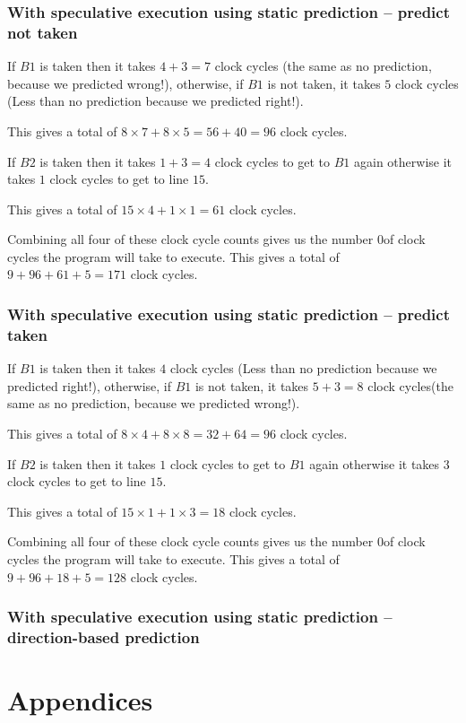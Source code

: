 \documentclass[12pt]{article}
\begin{document}
			\subsubsection{With speculative execution using static prediction – predict not taken}
			
				If $B1$ is taken then it takes $4 + 3 = 7$ clock cycles (the same as no prediction, because we predicted wrong!), otherwise, if $B1$ is not taken, it takes $5$ clock cycles (Less than no prediction because we predicted right!).
				
				This gives a total of $ 8\times7 + 8\times5 = 56 + 40 = 96$ clock cycles.
				
				If $B2$ is taken then it takes $1 + 3 = 4$ clock cycles to get to $B1$ again otherwise it takes $1$ clock cycles to get to line $15$.
			
				This gives a total of $15\times4 + 1\times1 = 61$ clock cycles.
				
				
				Combining all four of these clock cycle counts gives us the number 0of clock cycles the program will take to execute.
				This gives a total of $9 + 96 + 61 + 5 = 171$ clock cycles.
				
			\subsubsection{With speculative execution using static prediction – predict taken}
			
				If $B1$ is taken then it takes $4$ clock cycles  (Less than no prediction because we predicted right!), otherwise, if $B1$ is not taken, it takes $5 + 3 = 8$ clock cycles(the same as no prediction, because we predicted wrong!).
				
				This gives a total of $ 8\times4 + 8\times8 = 32 + 64 = 96$ clock cycles.
				
				If $B2$ is taken then it takes $1$ clock cycles to get to $B1$ again otherwise it takes $3$ clock cycles to get to line $15$.
			
				This gives a total of $15\times1 + 1\times3 = 18$ clock cycles.
				
				
				Combining all four of these clock cycle counts gives us the number 0of clock cycles the program will take to execute.
				This gives a total of $9 + 96 + 18 + 5 = 128$ clock cycles.
				
			\subsubsection{With speculative execution using static prediction – direction-based prediction}

\newpage
\printbibliography
\newpage

\appendix

\section*{Appendices}
	\renewcommand{\thesubsection}{\Alph{subsection}}

\end{document}
